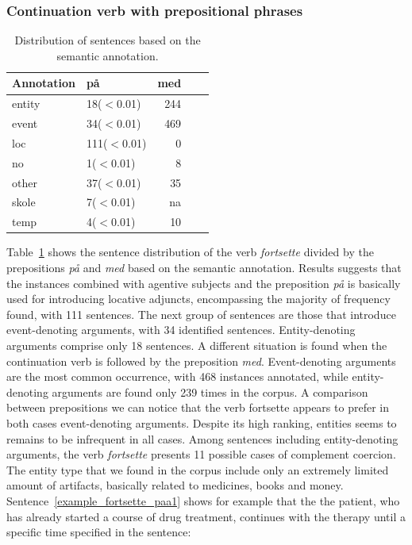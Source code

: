 \documentclass{article}
\begin{document}
\subsubsection{Continuation verb with prepositional phrases}
\begin{table}[h]
    \centering
    \begin{tabular}{llrrr}
    \toprule
    Annotation &  på &  med\\
    \midrule
    entity   &         18($<$0.01) &  244   \\
    event    &         34($<$0.01) &  469   \\
    loc     &        111($<$0.01) &   0  \\
    no      &          1($<$0.01) &  8   \\
    other   &         37($<$0.01)&   35  \\
    skole  &          7($<$0.01) &   na  \\
    temp   &          4($<$0.01) &    10 \\
    \bottomrule
    \end{tabular}
    \caption{Distribution of sentences based on the semantic annotation.}
    \label{tab:fortsette_semantic_adp}
\end{table}
\noindent Table~\ref{tab:fortsette_semantic_adp} shows the sentence distribution of the verb \emph{fortsette} divided by the prepositions \emph{på} and \emph{med} based on the semantic annotation. Results suggests that the instances combined with agentive subjects and the preposition \emph{på} is basically used for introducing locative adjuncts, encompassing the majority of frequency found, with 111 sentences. The next group of sentences are those that introduce event-denoting arguments, with 34 identified sentences. Entity-denoting arguments comprise only 18 sentences. A different situation is found when the continuation verb is followed by the preposition \emph{med}. Event-denoting arguments are the most common occurrence, with 468 instances annotated, while entity-denoting arguments are found only 239 times in the corpus. A comparison between prepositions we can notice that the verb fortsette appears to prefer in both cases event-denoting arguments. Despite its high ranking, entities seems to remains to be infrequent in all cases. 
Among sentences including entity-denoting arguments, the verb \emph{fortsette} presents 11 possible cases of complement coercion. The entity type that we found in the corpus include only an extremely limited amount of artifacts, basically related to medicines, books and money. Sentence~\ref{example_fortsette_paa1} shows for example that the the patient, who has already started a course of drug treatment, continues with the therapy until a specific time specified in the sentence:
        \ea \label{example_fortsette_paa1} %
\end{document}
